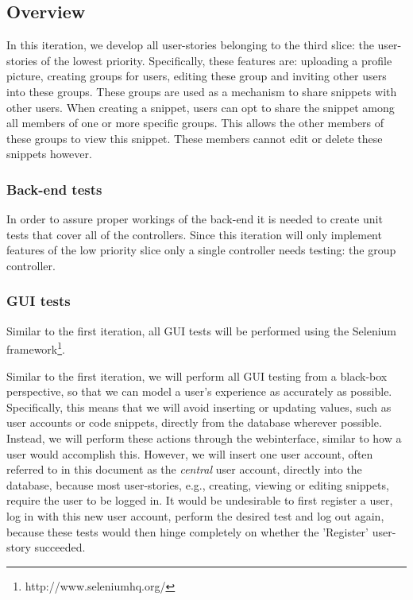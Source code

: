 \documentclass[10pt,a4paper,BCOR12mm, headexclude, footexclude,
  twoside, openright]{scrartcl}
\numberwithin{equation}{section} %
\numberwithin{figure}{section} %
\numberwithin{table}{section} %
\begin{document}
\subsection{Overview}
In this iteration, we develop all user-stories belonging to the third slice: the user-stories of the lowest priority. 
Specifically, these features are: uploading a profile picture, creating groups for users, editing these group and inviting other users into these groups.
These groups are used as a mechanism to share snippets with other users.
When creating a snippet, users can opt to share the snippet among all members of one or more specific groups.
This allows the other members of these groups to view this snippet. These members cannot edit or delete these snippets however.

\subsubsection*{Back-end tests}
In order to assure proper workings of the back-end it is needed to create unit tests that cover all of the controllers. Since this iteration will only implement features of the low priority slice only a single controller needs testing: the group controller.

\subsubsection*{GUI tests}
Similar to the first iteration, all GUI tests will be performed using the Selenium framework\footnote{http://www.seleniumhq.org/}.

Similar to the first iteration, we will perform all GUI testing from a black-box perspective, so that we can model a user's experience as accurately as possible.
Specifically, this means that we will avoid inserting or updating values, such as user accounts or code snippets, directly from the database wherever possible.
Instead, we will perform these actions through the webinterface, similar to how a user would accomplish this.
However, we will insert one user account, often referred to in this document as the \emph{central} user account, directly into the database, because most user-stories, e.g., creating, viewing or editing snippets, require the user to be logged in.
It would be undesirable to first register a user, log in with this new user account, perform the desired test and log out again, because these tests would then hinge completely on whether the 'Register' user-story succeeded.
\end{document}
